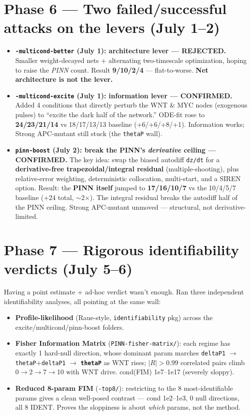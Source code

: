 \documentclass[11pt]{article}
\newcommand{\code}[1]{\texttt{\textcolor{codegray}{#1}}}
\begin{document}
\section*{Phase 6 --- Two failed/successful attacks on the levers (July 1--2)}
\begin{itemize}
\item \textbf{\code{-multicond-better} (July 1): architecture lever --- REJECTED.} Smaller weight-decayed nets + alternating two-timescale optimization, hoping to raise the \textit{PINN} count. Result \textbf{9/10/2/4} --- flat-to-worse. \textbf{Net architecture is not the lever.}
\item \textbf{\code{-multicond-excite} (July 1): information lever --- CONFIRMED.} Added 4 conditions that directly perturb the WNT \& MYC nodes (exogenous pulses) to ``excite the dark half of the network.'' ODE-fit rose to \textbf{24/23/21/14} vs 18/17/13/13 baseline (+6/+6/+8/+1). Information works; Strong APC-mutant still stuck (the \code{thetaP} wall).
\item \textbf{\code{pinn-boost} (July 2): break the PINN's \textit{derivative} ceiling --- CONFIRMED.} The key idea: swap the biased autodiff \code{dz/dt} for a \textbf{derivative-free trapezoidal/integral residual} (multiple-shooting), plus relative-error weighting, deterministic collocation, multi-start, and a SIREN option. Result: the \textbf{PINN itself} jumped to \textbf{17/16/10/7} vs the 10/4/5/7 baseline (+24 total, $\sim$2$\times$). The integral residual breaks the autodiff half of the PINN ceiling. Strong APC-mutant unmoved --- structural, not derivative-limited.
\end{itemize}

\section*{Phase 7 --- Rigorous identifiability verdicts (July 5--6)}
Having a point estimate + ad-hoc verdict wasn't enough. Ran three independent identifiability analyses, all pointing at the same wall:
\begin{itemize}
\item \textbf{Profile-likelihood} (Raue-style, \code{identifiability} pkg) across the excite/multicond/pinn-boost folders.
\item \textbf{Fisher Information Matrix} (\code{PINN-fisher-matrix/}): each regime has exactly 1 hard-null direction, whose dominant param marches \code{deltaP1} $\rightarrow$ \code{thetaP}+\code{deltaP1} $\rightarrow$ \textbf{\code{thetaP}} as WNT rises; $|R|>0.99$ correlated pairs climb 0$\rightarrow$2$\rightarrow$7$\rightarrow$10 with WNT drive. cond(FIM) 1e7--1e17 (severely sloppy).
\item \textbf{Reduced 8-param FIM} (\code{-top8/}): restricting to the 8 most-identifiable params gives a clean well-posed contrast --- cond 1e2--1e3, 0 null directions, all 8 IDENT. Proves the sloppiness is about \textit{which} params, not the method.
\end{itemize}
\end{document}
